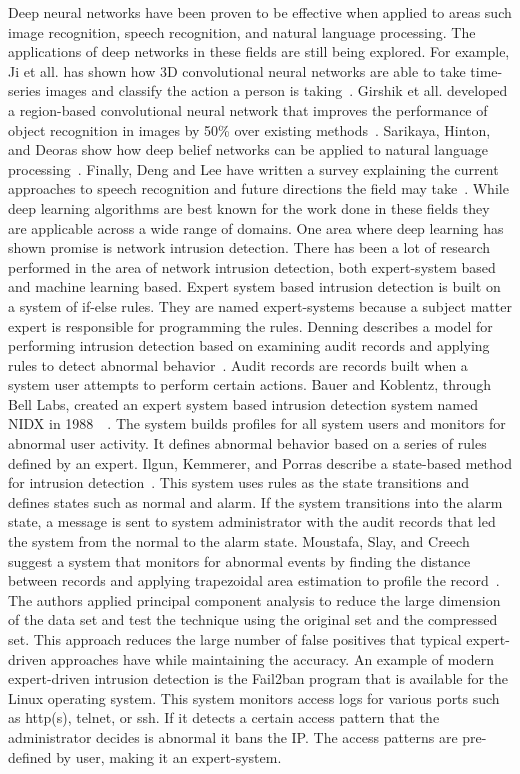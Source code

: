 \documentclass{article}
\begin{document}
Deep neural networks have been proven to be effective when applied to areas such image recognition, speech recognition, and natural language processing. The applications of deep networks in these fields are still being explored. For example, Ji et all. has shown how 3D convolutional neural networks are able to take time-series images and classify the action a person is taking~\cite{image-rec1}. Girshik et all. developed a region-based convolutional neural network that improves the performance of object recognition in images by 50\% over existing methods~\cite{image-rec2}. Sarikaya, Hinton, and Deoras show how deep belief networks can be applied to natural language processing~\cite{natural-lang1}. Finally, Deng and Lee have written a survey explaining the current approaches to speech recognition and future directions the field may take~\cite{speech-rec1}. While deep learning algorithms are best known for the work done in these fields they are applicable across a wide range of domains. One area where deep learning has shown promise is network intrusion detection. There has been a lot of research performed in the area of network intrusion detection, both expert-system based and machine learning based. Expert system based intrusion detection is built on a system of if-else rules. They are named expert-systems because a subject matter expert is responsible for programming the rules. Denning describes a model for performing intrusion detection based on examining audit records and applying rules to detect abnormal behavior~\cite{expert4}. Audit records are records built when a system user attempts to perform certain actions. Bauer and Koblentz, through Bell Labs, created an expert system based intrusion detection system named NIDX in 1988~\cite{expert2}~\cite{expert1}. The system builds profiles for all system users and monitors for abnormal user activity. It defines abnormal behavior based on a series of rules defined by an expert. Ilgun, Kemmerer, and Porras describe a state-based method for intrusion detection~\cite{expert3}. This system uses rules as the state transitions and defines states such as normal and alarm. If the system transitions into the alarm state, a message is sent to system administrator with the audit records that led the system from the normal to the alarm state. Moustafa, Slay, and Creech suggest a system that monitors for abnormal events by finding the distance between records and applying trapezoidal area estimation to profile the record~\cite{expert5}. The authors applied principal component analysis to reduce the large dimension of the data set and test the technique using the original set and the compressed set. This approach reduces the large number of false positives that typical expert-driven approaches have while maintaining the accuracy. An example of modern expert-driven intrusion detection is the Fail2ban program that is available for the Linux operating system. This system monitors access logs for various ports such as http(s), telnet, or ssh. If it detects a certain access pattern that the administrator decides is abnormal it bans the IP. The access patterns are pre-defined by user, making it an expert-system. 
\end{document}
